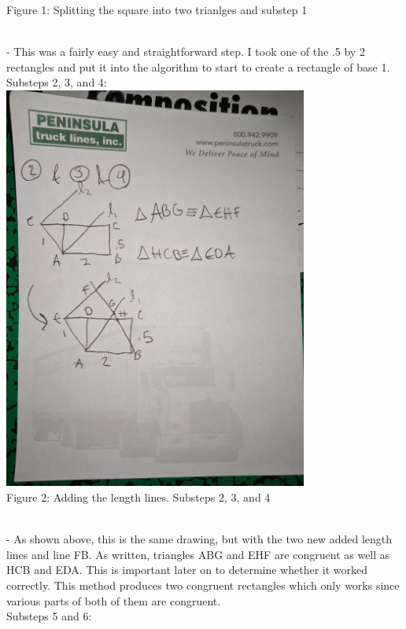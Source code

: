 \documentclass{article}
\begin{document}
\caption{Figure 1: Splitting the square into two trianlges and substep 1}\\
- This was a fairly easy and straightforward step. I took one of the .5 by 2 rectangles and put it into the algorithm to start to create a rectangle of base 1.\\
Substeps 2, 3, and 4:\\
\includegraphics[width=10cm]{Ex 6.jpg}\\
\caption{Figure 2: Adding the length lines. Substeps 2, 3, and 4}\\
- As shown above, this is the same drawing, but with the two new added length lines and line FB. As written, triangles ABG and EHF are congruent as well as HCB and EDA. This is important later on to determine whether it worked correctly. This method produces two congruent rectangles which only works since various parts of both of them are congruent.\\
Substeps 5 and 6:\\



\end{document}
